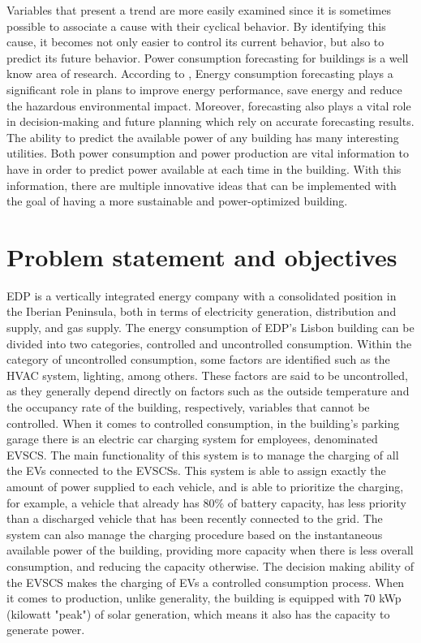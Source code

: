 Variables that present a trend are more easily examined since it is sometimes possible to associate a cause with their cyclical behavior. By identifying this cause, it becomes not only easier to control its current behavior, but also to predict its future behavior. Power consumption forecasting for buildings is a well know area of research. According to \cite{CivilEU}, Energy consumption forecasting plays a significant role in plans to improve energy performance, save energy and reduce the hazardous environmental impact. Moreover, forecasting also plays a vital role in decision-making and future planning which rely on accurate forecasting results. The ability to predict the available power of any building has many interesting utilities. Both power consumption and power production are vital information to have in order to predict power available at each time in the building. With this information, there are multiple innovative ideas that can be implemented with the goal of having a more sustainable and power-optimized building.



\section{Problem statement and objectives}


\ac{EDP} is a vertically integrated energy company with a consolidated position in the Iberian Peninsula, both in terms of electricity generation, distribution and supply, and gas supply. The energy consumption of \ac{EDP}'s Lisbon building can be divided into two categories, controlled and uncontrolled consumption. Within the category of uncontrolled consumption, some factors are identified such as the \ac{HVAC} system, lighting, among others. These factors are said to be uncontrolled, as they generally depend directly on factors such as the outside temperature and the occupancy rate of the building, respectively, variables that cannot be controlled. When it comes to controlled consumption, in the building's parking garage there is an electric car charging system for employees, denominated \ac{EVSCS}. The main functionality of this system is to manage the charging of all the \ac{EV}s connected to the \ac{EVSCSs}. This system is able to assign exactly the amount of power supplied to each vehicle, and is able to prioritize the charging, for example, a vehicle that already has 80$\%$ of battery capacity, has less priority than a discharged vehicle that has been recently connected to the grid. The system can also manage the charging procedure based on the instantaneous available power of the building, providing more capacity when there is less overall consumption, and reducing the capacity otherwise. The decision making ability of the \ac{EVSCS} makes the charging of \ac{EV}s a controlled consumption process. When it comes to production, unlike generality, the building is equipped with 70 kWp (kilowatt "peak") of solar generation, which means it also has the capacity to generate power. 


